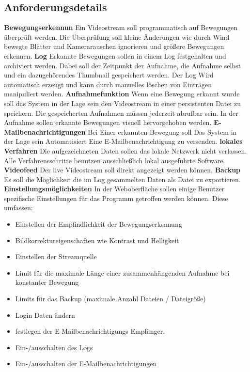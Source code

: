 \subsection{Anforderungsdetails}
\textbf{Bewegungserkennun}\newline
Ein Videostream soll programmatisch auf Bewegungen überprüft werden. Die Überprüfung soll kleine Änderungen wie durch Wind bewegte Blätter und Kamerarauschen ignorieren und größere Bewegungen erkennen.
\newline
\textbf{Log}\newline
Erkannte Bewegungen sollen in einem Log festgehalten und archiviert werden.
Dabei soll der Zeitpunkt der Aufnahme, die Aufnahme selbst und ein dazugehörendes Thumbnail gespeichert werden. Der Log Wird automatisch erzeugt und kann durch manuelles löschen von Einträgen manipuliert werden.
\newline
\textbf{Aufnahmefunktion}\newline
Wenn eine Bewegung erkannt wurde soll das System in der Lage sein den Videostream in einer persistenten Datei zu speichern.
Die gespeicherten Aufnahmen müssen jederzeit abrufbar sein.
In der Aufnahme sollen erkannte Bewegungen visuell hervorgehoben werden.
\newline
\textbf{E-Mailbenachrichtigungen}\newline
Bei Einer erkannten Bewegung soll Das System in der Lage sein Automatisiert Eine E-Mailbenachrichtigung zu versenden.
\newline
\textbf{lokales Verfahren}\newline
Die aufgezeichneten Daten sollen das lokale Netzwerk nicht verlassen.
Alle Verfahrensschritte benutzen ausschließlich lokal ausgeführte Software.
\newline
\textbf{Videofeed}\newline
Der live Videostream soll direkt angezeigt werden können.
\newline
\textbf{Backup}\newline
Es soll die Möglichkeit die im Log gesammelten Daten als Datei zu exportieren.
\newline
\textbf{Einstellungsmöglichkeiten}\newline
In der Weboberfläche sollen einige Benutzer spezifische Einstellungen für das Programm getroffen werden können.
Diese umfassen: 
\begin{itemize}
\item Einstellen der Empfindlichkeit der Bewegungserkennung
\item Bildkorrektureigenschaften wie Kontrast und Helligkeit
\item Einstellen der Streamquelle
\item Limit für die maximale Länge einer zusammenhängenden Aufnahme bei konstanter Bewegung
\item Limits für das Backup (maximale Anzahl Dateien / Dateigröße)
\item Login Daten ändern
\item festlegen der E-Mailbenachrichtigungs Empfänger.
\item Ein-/ausschalten des Logs
\item Ein-/ausschalten der E-Mailbenachrichtigungen
\end{itemize}
